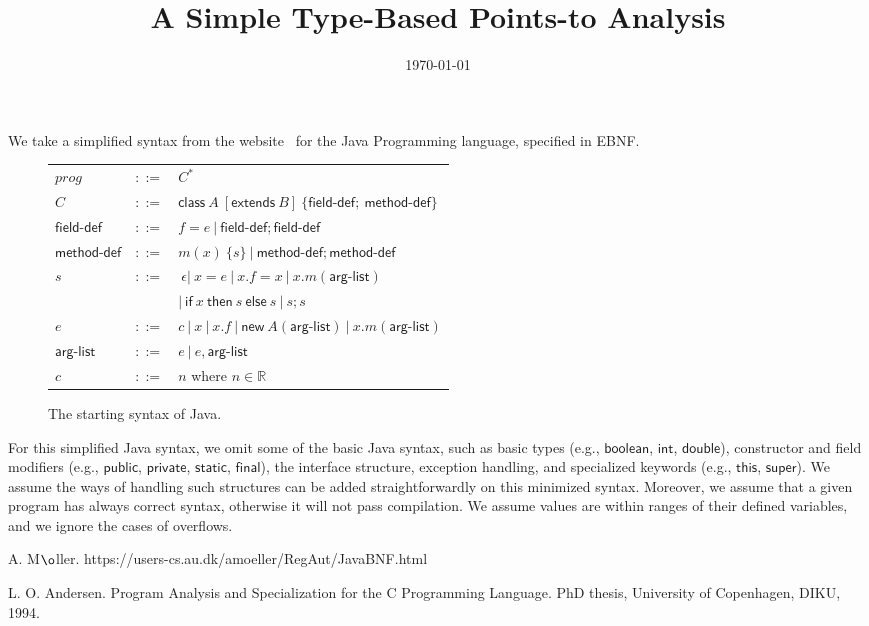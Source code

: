 \documentclass{paper}
\newcommand{\keyword}[1]{\mathsf{#1}}
\newcommand{\kwboolean}{\keyword{boolean}}
\newcommand{\kwint}{\keyword{int}}
\newcommand{\kwdouble}{\keyword{double}}
\newcommand{\kwpublic}{\keyword{public}}
\newcommand{\kwprivate}{\keyword{private}}
\newcommand{\kwstatic}{\keyword{static}}
\newcommand{\kwfinal}{\keyword{final}}
\newcommand{\kwnew}[0]{\keyword{new}}
\newcommand{\kwextends}[0]{\keyword{extends}}
\newcommand{\kwclass}[0]{\keyword{class}}
\newcommand{\kwthis}[0]{\keyword{this}}
\newcommand{\kwsuper}[0]{\keyword{super}}
\newcommand{\kwif}[0]{\keyword{if}}
\newcommand{\kwthen}[0]{\keyword{then}}
\newcommand{\kwelse}[0]{\keyword{else}}
\newcommand{\kwfielddef}{\keyword{field\mbox{-}def}}
\newcommand{\kwmethoddef}{\keyword{method\mbox{-}def}}
\newcommand{\kwarglist}{\keyword{arg\mbox{-}list}}
\begin{document}
\title{A Simple Type-Based Points-to Analysis}
\author{\today}

\maketitle

We take a simplified syntax from the website~\cite{amoeller-web} for the Java Programming language, specified in EBNF.

\begin{figure}[!htbp]\centering
	\begin{tabular}[c]{lll} 
        $prog$&$::=$&$C^*$\\
		$C$&$::=$&$\kwclass\ A\ [\kwextends\ B] \ \{\kwfielddef;\ \kwmethoddef\}$\\
        $\kwfielddef$&$::=$&$f{=}e\ |\ \kwfielddef; \kwfielddef$\\
		$\kwmethoddef$&$::=$&$m(x) \ \{s\}\ |\ \kwmethoddef; \kwmethoddef$\\
		$s$&$::=$&$\ \epsilon |\  x {=} e \ |\ x.f{=}x \ |\ x.m(\kwarglist)$ \\
		&&$|\ \kwif \ x \ \kwthen \ s \ \kwelse \ s \ |\ s;s$\\
		$e$&$::=$&$c \ |\ x \ |\ x.f\ |\ \kwnew \ A(\kwarglist)\ |\ x.m(\kwarglist)$\\
        $\kwarglist$&$::=$&$e\ |\ e,\kwarglist$\\
        $c$&$::=$&$n$ where $n\in\mathbb{R}$\\
	\end{tabular}
	\caption{The starting syntax of Java. \label{fig:syntax}}
\end{figure}

For this simplified Java syntax, we omit some of the basic Java syntax, such as basic types (e.g., $\kwboolean$, $\kwint$, $\kwdouble$), constructor and field modifiers (e.g., $\kwpublic$, $\kwprivate$, $\kwstatic$, $\kwfinal$), the interface structure, exception handling, and specialized keywords (e.g., $\kwthis$, $\kwsuper$). We assume the ways of handling such structures can be added straightforwardly on this minimized syntax. Moreover, we assume that a given program has always correct syntax, otherwise it will not pass compilation. We assume values are within ranges of their defined variables, and we ignore the cases of overflows.





\begin{thebibliography}{4}

A. M$\o$ller.
https://users-cs.au.dk/amoeller/RegAut/JavaBNF.html
 
L. O. Andersen. 
Program Analysis and Specialization for the C Programming Language. 
PhD thesis, University of Copenhagen, DIKU, 1994.

\end{thebibliography}
\end{document}
